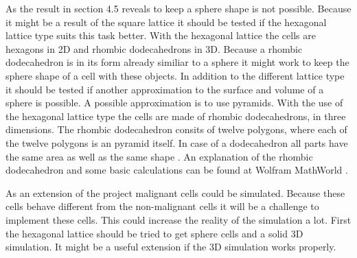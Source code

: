 As the result in section 4.5 reveals to keep a sphere shape is not possible. Because it might be a result of the square lattice it should be tested if the hexagonal lattice type suits this task better. With the hexagonal lattice the cells are hexagons in 2D and rhombic dodecahedrons in 3D. Because a rhombic dodecahedron is in its form already similiar to a sphere it might work to keep the sphere shape of a cell with these objects. \newline
In addition to the different lattice type it should be tested if another approximation to the surface and volume of a sphere is possible. A possible approximation is to use pyramids. With the use of the hexagonal lattice type the cells are made of rhombic dodecahedrons, in three dimensions. The rhombic dodecahedron consits of twelve polygons, where each of the twelve polygons is an pyramid itself. In case of a dodecahedron all parts have the same area as well as the same shape \cite{Horn1984}. An explanation of the rhombic dodecahedron and some basic calculations can be found at Wolfram MathWorld \cite{RhombicDodecahedron.html}.

As an extension of the project malignant cells could be simulated. Because these cells behave different from the non-malignant cells it will be a challenge to implement these cells. This could increase the reality of the simulation a lot. First the hexagonal lattice should be tried to get sphere cells and a solid 3D simulation. It might be a useful extension if the 3D simulation works properly.

